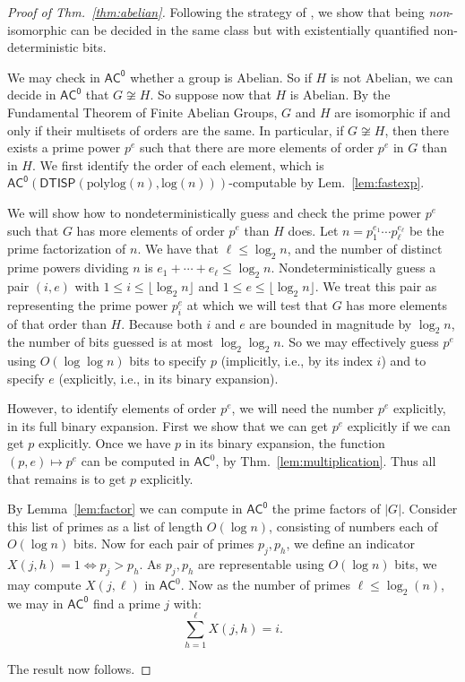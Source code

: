 \documentclass{article}
\newcommand{\Lem}[1]{Lem.~\ref{#1}\xspace}
\newcommand{\Thm}[1]{Thm.~\ref{#1}\xspace}
\newcommand*{\ComplexityClass}[1]{\ensuremath{\mathsf{#1}}\xspace}
\newcommand{\DTISP}{\ComplexityClass{DTISP}}
\newcommand{\DTISPpll}{\ensuremath{\DTISP(\mathrm{polylog}(n),\mathrm{log}(n))}\xspace}
\newcommand{\ACz}{\ComplexityClass{AC^0}}
\begin{document}
\begin{proof}[Proof of \Thm{thm:abelian}]
Following the strategy of \cite[Theorem~7.15]{GrochowLevetWL}, we show that being \textit{non}-isomorphic can be decided in the same class but with existentially quantified non-deterministic bits. 

We may check in \ACz whether a group is Abelian. So if $H$ is not Abelian, we can decide in \ACz that $G \not \cong H$. So suppose now that $H$ is Abelian. By the Fundamental Theorem of Finite Abelian Groups, $G$ and $H$ are isomorphic if and only if their multisets of orders are the same. In particular, if $G \not \cong H$, then there exists a prime power $p^{e}$ such that there are more elements of order $p^{e}$ in $G$ than in $H$. We first identify the order of each element, which is $\ACz(\DTISPpll)$-computable by \Lem{lem:fastexp}.

We will show how to nondeterministically guess and check the prime power $p^e$ such that $G$ has more elements of order $p^e$ than $H$ does. Let $n = p_{1}^{e_{1}} \cdots p_{\ell}^{e_{\ell}}$ be the prime factorization of $n$. We have that $\ell \leq \log_{2} n$, and the number of distinct prime powers dividing $n$ is $e_{1} + \cdots + e_{\ell} \leq \log_{2} n$. Nondeterministically guess a pair $(i,e)$ with $1 \leq i \leq \lfloor \log_2 n \rfloor$ and $1 \leq e \leq \lfloor \log_2 n \rfloor$. We treat this pair as representing the prime power $p_i^e$ at which we will test that $G$ has more elements of that order than $H$. Because both $i$ and $e$ are bounded in magnitude by $\log_2 n$, the number of bits guessed is at most $\log_2 \log_2 n$. So we may effectively guess $p^{e}$ using $O(\log \log n)$ bits to specify $p$ (implicitly, i.e., by its index $i$) and to specify $e$ (explicitly, i.e., in its binary expansion). 

However, to identify elements of order $p^e$, we will need the number $p^e$ explicitly, in its full binary expansion. First we show that we can get $p^e$ explicitly if we can get $p$ explicitly. Once we have $p$ in its binary expansion, the function $(p,e) \mapsto p^e$ can be computed in $\mathsf{AC}^0$, by \Thm{lem:multiplication}. 
Thus all that remains is to get $p$ explicitly. 



By Lemma~\ref{lem:factor} we can compute in \ACz the prime factors of $|G|$. Consider this list of primes as a list of length $O(\log n)$, consisting of numbers each of $O(\log n)$ bits. Now for each pair of primes $p_{j}, p_{h}$, we define an indicator $X(j,h) = 1 \iff p_{j} > p_{h}$. As $p_{j}, p_{h}$ are representable using $O(\log n)$ bits, we may compute $X(j, \ell)$ in $\mathsf{AC}^{0}$. Now as the number of primes $\ell \leq \log_{2}(n)$, we may in $\ACz$ find a prime $j$ with:
\[
\sum_{h=1}^{\ell} X(j,h) = i.
\]

\noindent The result now follows. 
\end{proof}
\end{document}
